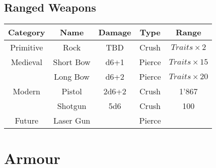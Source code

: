 \subsection{Ranged Weapons}
\begin{center}
\begin{tabular}{c | c | c | c | c}
    \textbf{Category} & \textbf{Name} & \textbf{Damage} & \textbf{Type} & \textbf{Range} \\\hline
    Primitive & Rock        &  TBD  & Crush  & $Traits \times 2$ \\\hline
    Medieval  & Short Bow   & d6+1  & Pierce & $Traits \times 15$ \\
              & Long Bow    & d6+2  & Pierce & $Traits \times 20$ \\\hline
    Modern    & Pistol      & 2d6+2 & Crush  & 1'867 \\
              & Shotgun     & 5d6   & Crush  & 100 \\\hline
    Future    & Laser Gun   &       & Pierce & 
\end{tabular}
\end{center}
\section{Armour}